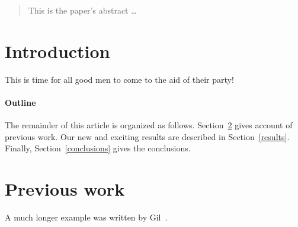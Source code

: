 \documentclass[12pt]{article}
\begin{document}
\maketitle

\begin{abstract}
This is the paper's abstract \ldots
\end{abstract}

\section{Introduction}


\begin{landscape}
\scalebox{0.8}{

}
\end{landscape}




  
  

  \begin{gantt}{10}{12}
    \begin{ganttitle}
    \end{ganttitle}
  \end{gantt}
  
This is time for all good men to come to the aid of their party!

\paragraph{Outline}
The remainder of this article is organized as follows.
Section~\ref{previous work} gives account of previous work.
Our new and exciting results are described in Section~\ref{results}.
Finally, Section~\ref{conclusions} gives the conclusions.

\section{Previous work}\label{previous work}
A much longer \LaTeXe{} example was written by Gil~\cite{Gil:02}.

  
\end{document}

